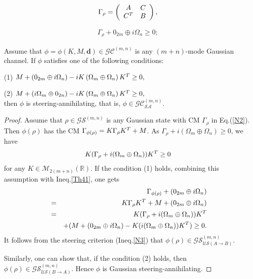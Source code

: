 \documentclass[10pt,a4paper]{amsart}
\begin{document}
\begin{eqnarray}\label{N2}
	\Gamma_{\rho}=\left(\begin{array}{cc}A& C\\
		C^{\rm T} & B\end{array}\right),
\end{eqnarray}

\begin{eqnarray}\label{N3}
	\Gamma_\rho+0_{2m}\oplus i\Omega_{n}\geq0;
\end{eqnarray}

\begin{theorem}  \label{TH3}  Assume that $\phi =\phi\left( {K,M,\mathbf d} \right) \in {\mathcal {GC}}^{(m,n)}$ is any $(m+n)$-mode Gaussian channel. If $\phi$ satisfies one of the following conditions: 
		
 {\rm (1)}	 $M + ({0_{2m}} \oplus i{\Omega _n}) - iK\left( \Omega _m \oplus \Omega _n \right){K^{\rm T}} \ge 0,$
 
{\rm (2)} $M + ( i{\Omega _m} \oplus{0_{2n}}) - iK\left( \Omega _m \oplus \Omega _n \right){K^{\rm T}} \ge 0,$\\
then $\phi $ is steering-annihilating,  that is,
$\phi \in  {\mathcal {GC}}^{(m,n)}_{\mathcal {SA}}$.
\end{theorem}		

\begin{proof}
	Assume that  $\rho  \in {\mathcal {GS}}^{(m,n)} $ is any Gaussian state  with CM $\Gamma_{\rho} $ in Eq.(\ref{N2}).  Then
	$\phi(\rho) $ has the CM $\Gamma_{\phi(\rho)} = K\Gamma_\rho {K^{\rm T}} + M$.
	 As
	$\Gamma_{\rho}  + i( \Omega_m \oplus \Omega_n ) \ge 0$,   we have  
	\begin{equation}\label{Th41}
			K(\Gamma_{\rho}+i( \Omega_m \oplus \Omega_n ))K^{\rm T} \ge 0 \end{equation} 
			for any $ K \in \mathcal M_{2(m+n)}(\mathbb R)$.  If  the condition (1) holds, combining  this assumption  with Ineq.\eqref{Th41},  one gets
\begin{eqnarray*}
& &\Gamma _{\phi ( \rho )} + ( 0_{2m} \oplus i{\Omega _n})\\
&=& K\Gamma_{\rho} {K^{\rm T}} + M + ( 0_{2m} \oplus i{\Omega _n} )\\
 &=& K(\Gamma_{\rho}+i( \Omega_m \oplus \Omega_n ))K^{\rm T}\\
& &+( M + ( 0_{2m} \oplus i\Omega_n)-K(i( \Omega_m \oplus \Omega_n ))K^{\rm T})\ge   0.
\end{eqnarray*}
It follows from  the steering criterion (Ineq.\eqref{N3})  that $\phi \left( \rho \right) \in \mathcal  {GS}^{(m,n)}_{\mathcal {US}(A \rightarrow  B)}$.

Similarly, one can show that, if the condition (2) holds, then  $\phi \left( \rho \right) \in \mathcal  {GS}^{(m,n)}_{\mathcal {US}(B \rightarrow  A)}$.
Hence $ \phi $ is Gaussian steering-annihilating.
\end{proof}	
\end{document}

